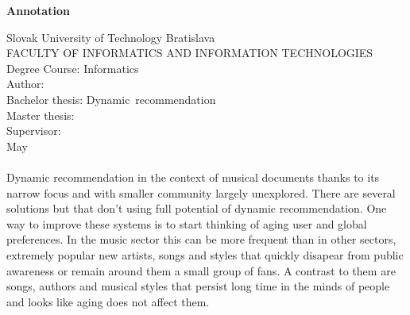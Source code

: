 \newpage\null\thispagestyle{empty}\newpage
\thispagestyle{plain}
\begin{center}
\begin{Large}
\textbf{Annotation} \\
\end{Large}
\end{center}
Slovak University of Technology Bratislava \\
FACULTY OF INFORMATICS AND INFORMATION TECHNOLOGIES \\
\noindent
Degree Course: Informatics \\
\noindent
Author: \Author \\
{
    {Bachelor thesis: }\mbox{Dynamic recommendation}\\
}
{
    {Master thesis: }\Title \\
}
Supervisor: \Supervisor \\
May \Year \\
\noindent
\\
Dynamic recommendation in the context of musical documents thanks to its narrow focus and with smaller community largely unexplored. There are several solutions but that don't using full potential of dynamic recommendation. One way to improve these systems is to start thinking of aging user and global preferences. In the music sector this can be more frequent than in other sectors, extremely popular new artists, songs and styles that quickly disapear from public awareness or remain around them a small group of fans. A contrast to them are songs, authors and musical styles that persist long time in the minds of people and looks like aging does not affect them.

